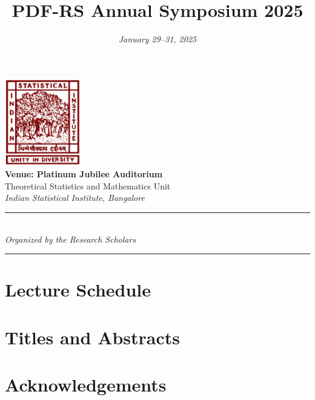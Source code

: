 \documentclass[a4paper,12pt]{article}
\title{\Huge\textbf{PDF-RS Annual Symposium 2025}}
\author{} %
\date{\vspace{-1cm}\Large\textit{January 29--31, 2025}}
\begin{document}
	
	\maketitle
	\thispagestyle{empty} %
	
	\begin{center}
		\vspace{1.5cm}
		\includegraphics[width=0.25\textwidth]{images/isi_logo.png} \\[1.5cm]
		
		{\Huge\textbf{Venue: Platinum Jubilee Auditorium}} \\[0.4cm]
		{\Large Theoretical Statistics and Mathematics Unit} \\[0.3cm]
		{\large \textit{Indian Statistical Institute, Bangalore}} \\[2cm]
		
		\rule{\textwidth}{0.5pt} \\[0.6cm]
		{\Large\textit{Organized by the Research Scholars}} \\[0.6cm]
		\rule{\textwidth}{0.5pt}
	\end{center}
	
	\newpage
	
	\section*{Lecture Schedule}
	
	\newpage
	
	\section*{Titles and Abstracts}

    
    
    
    


    
    
    
	
    

    
    
    
    
    

    \section*{Acknowledgements}
    
    
    \newpage
    
    \nocite{*} 
    \printbibliography
    
\end{document}
